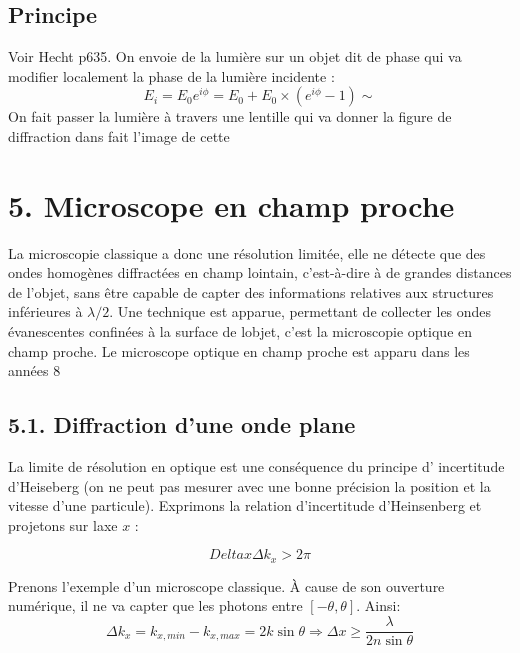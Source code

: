 \documentclass[french, a4paper, 10pt, twocolumn, landscape]{article}
\begin{document}
\subsection*{Principe}
Voir Hecht p635. On envoie de la lumière sur un objet dit de phase qui va modifier localement la phase de la lumière incidente :
\begin{equation}
    E_i = E_0e^{i\phi} = E_0 + E_0\times(e^{i\phi}-1) \sim 
\end{equation}
On fait passer la lumière à travers une lentille qui va donner la figure de diffraction dans fait l'image de cette 

\section*{5. Microscope en champ proche}

La microscopie classique a donc une résolution limitée, elle ne détecte que des ondes homogènes diffractées en champ lointain, c'est-à-dire à de grandes distances de l'objet, sans être capable de capter des informations
relatives aux structures inférieures à $\lambda/2$. Une technique est apparue, permettant de collecter les ondes évanescentes confinées à la surface de lobjet,
c'est la microscopie optique en champ proche. Le microscope optique en champ proche est apparu dans les années 8


\subsection*{5.1. Diffraction d'une onde plane}

La limite de résolution en optique est une conséquence du principe d' incertitude d'Heiseberg (on ne peut pas mesurer avec une bonne précision la
position et la vitesse d'une particule).
Exprimons la relation d'incertitude d'Heinsenberg et projetons sur laxe
$x$ :

\begin{equation}
	Delta x \Delta k_x > 2\pi
\end{equation}
	
Prenons l'exemple d'un microscope classique. À cause de son ouverture numérique, il ne va capter que les photons entre $[-\theta,\theta]$. Ainsi: 
\begin{equation}
	\Delta k_x = k_{x, min} - k_{x, max} = 2k\sin\theta \Rightarrow \Delta x\geq \dfrac{\lambda}{2n\sin\theta}
\end{equation}
\end{document}
